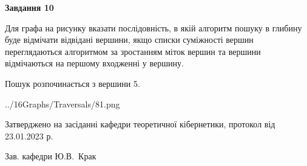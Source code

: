 \documentclass[12pt, ukrainian]{article}
\begin{document}
{\begin {large}
{\begin {center}\textbf{Завдання 10}\end {center}}\par
Для графа на рисунку вказати послідовність, в якій алгоритм пошуку в глибину буде відмічати відвідані вершини, якщо списки суміжності вершин переглядаються алгоритмом за зростанням міток вершин та вершини відмічаються на першому вход\-женні у вершину.\par
Пошук розпочинається з вершини 5.\par

\begin{center}
	{../16Graphs/Traversals/81.png}
\end{center}\par
\newpage


\end {large}
}
{\smallskip \begin {small} Затверджено на засіданні кафедри теоретичної кібернетики, протокол  від   23.01.2023 р.\par\smallskip\smallskip
{\parbox {6.5 cm}{Зав. кафедри \dotfill Ю.В.~Крак}} \end{small}}
\end{document}
